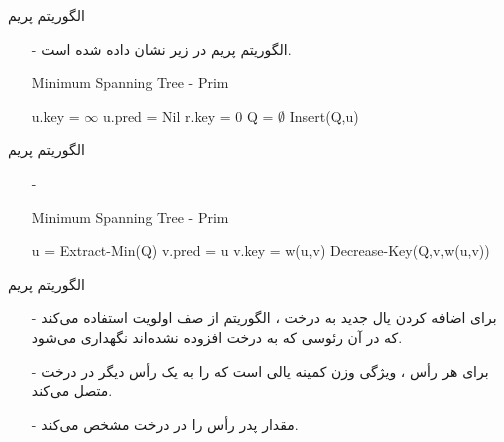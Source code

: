 \begin{frame}{‌الگوریتم پریم}
\begin{itemize}\itemr
\item[-]
الگوریتم پریم در زیر نشان داده شده است.
\begin{algorithm}[H]\alglr
  \caption{Minimum Spanning Tree - Prim} 
  \begin{algorithmic}[1]
   		\State u.key = $\infty$
   		\State u.pred = Nil
   	\EndFor
   	\State r.key = 0
   	\State Q = $\emptyset$
   			\State Insert(Q,u)
   	\EndFor                    
  \end{algorithmic}
  \label{alg:merge}
\end{algorithm}
\end{itemize}
\end{frame}


\begin{frame}{‌الگوریتم پریم}
\begin{itemize}\itemr
\item[-]
\begin{algorithm}[H]\alglr
  \caption{Minimum Spanning Tree - Prim} 
  \begin{algorithmic}[1]
   \setcounter{ALG@line}{7}
   			\State u = Extract-Min(Q)		
   					
   							\State v.pred = u
   							\State v.key = w(u,v)
   							\State Decrease-Key(Q,v,w(u,v))
   					\EndIf
   			\EndFor
   	\EndWhile                           
  \end{algorithmic}
  \label{alg:merge}
\end{algorithm}
\end{itemize}
\end{frame}


\begin{frame}{‌الگوریتم پریم}
\begin{itemize}\itemr
\item[-]
برای اضافه کردن یال جدید به درخت
، الگوریتم از صف اولویت
استفاده می‌کند که در آن رئوسی که به درخت افزوده نشده‌اند نگهداری می‌شود.
\item[-]
برای هر رأس
، ویژگی
وزن کمینه یالی است که
را به یک رأس دیگر در درخت متصل می‌کند.
\item[-]
مقدار
پدر رأس
را در درخت مشخص می‌کند.
\end{itemize}
\end{frame}


